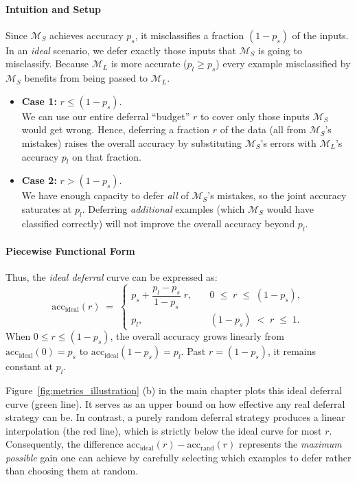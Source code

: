 \paragraph{Intuition and Setup}
Since \(\mathcal{M}_S\) achieves accuracy \(p_s\), it misclassifies a fraction \((1 - p_s)\) of the inputs. In an \emph{ideal} scenario, we defer exactly those inputs that \(\mathcal{M}_S\) is going to misclassify. Because \(\mathcal{M}_L\) is more accurate (\(p_l \ge p_s\)) every example misclassified by \(\mathcal{M}_S\) benefits from being passed to \(\mathcal{M}_L\).

\begin{itemize}
    \item \textbf{Case 1:} \(r \le (1 - p_s)\).\\
    We can use our entire deferral “budget” \(r\) to cover only those inputs \(\mathcal{M}_S\) would get wrong. Hence, deferring a fraction \(r\) of the data (all from \(\mathcal{M}_S\)'s mistakes) raises the overall accuracy by substituting \(\mathcal{M}_S\)'s errors with \(\mathcal{M}_L\)'s accuracy \(p_l\) on that fraction.
    \item \textbf{Case 2:} \(r > (1 - p_s)\).\\
    We have enough capacity to defer \emph{all} of \(\mathcal{M}_S\)'s mistakes, so the joint accuracy saturates at \(p_l\). Deferring \emph{additional} examples (which \(\mathcal{M}_S\) would have classified correctly) will not improve the overall accuracy beyond \(p_l\).
\end{itemize}

\paragraph{Piecewise Functional Form}
Thus, the \emph{ideal deferral} curve can be expressed as:
\begin{equation}
\mathrm{acc}_{\mathrm{ideal}}(r) \;=\;
\begin{cases}
p_s + \dfrac{p_l - p_s}{\,1 - p_s\,} \; r,
& \quad 0 \;\le\; r \;\le\; (1 - p_s), \\[1em]
p_l,
& \quad (1 - p_s) \;<\; r \;\le\; 1.
\end{cases}
\end{equation}
When \(0 \le r \le (1 - p_s)\), the overall accuracy grows linearly from \(\mathrm{acc}_{\mathrm{ideal}}(0) = p_s\) to \(\mathrm{acc}_{\mathrm{ideal}}(1-p_s) = p_l\). Past \(r = (1 - p_s)\), it remains constant at \(p_l\). 

Figure~\ref{fig:metrics_illustration} (b) in the main chapter plots this ideal deferral curve (green line). It serves as an upper bound on how effective any real deferral strategy can be. In contrast, a purely random deferral strategy produces a linear interpolation (the red line), which is strictly below the ideal curve for most \(r\). Consequently, the difference
\(\mathrm{acc}_{\mathrm{ideal}}(r) - \mathrm{acc}_{\mathrm{rand}}(r)\)
represents the \emph{maximum possible} gain one can achieve by carefully selecting which examples to defer rather than choosing them at random.

